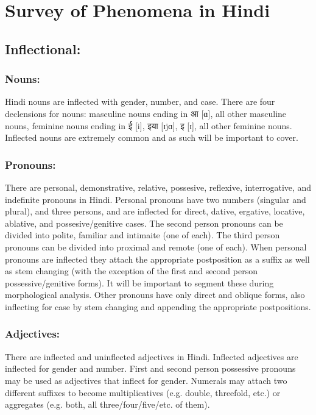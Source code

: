 \documentclass[11pt,letterpaper]{article}
\begin{document}
\section{Survey of Phenomena in Hindi}
\subsection{Inflectional:}
\subsubsection{Nouns:}
Hindi nouns are inflected with gender, number, and case. There are four declensions for nouns: masculine nouns ending in आ [ɑ], all other masculine nouns, feminine nouns ending in {ई [i], इया [ɪjɑ], इ [ɪ]}, all other feminine nouns. Inflected nouns are extremely common and as such will be important to cover.
\subsubsection{Pronouns:}
There are personal, demonstrative, relative, possesive, reflexive, interrogative, and indefinite pronouns in Hindi. 
Personal pronouns have two numbers (singular and plural), and three persons, and are inflected for direct, dative, ergative, locative, ablative, and possesive/genitive cases. The second person pronouns can be divided into polite, familiar and intimaite (one of each). The third person pronouns can be divided into proximal and remote (one of each). When personal pronouns are inflected they attach the appropriate postposition as a suffix as well as stem changing (with the exception of the first and second person possessive/genitive forms). It will be important to segment these during morphological analysis.
Other pronouns have only direct and oblique forms, also inflecting for case by stem changing and appending the appropriate postpositions.
\subsubsection{Adjectives:}
There are inflected and uninflected adjectives in Hindi. Inflected adjectives are inflected for gender and number. First and second person possessive pronouns may be used as adjectives that inflect for gender. Numerals may attach two different suffixes to become multiplicatives (e.g. double, threefold, etc.) or aggregates (e.g. both, all three/four/five/etc. of them).
\end{document}
